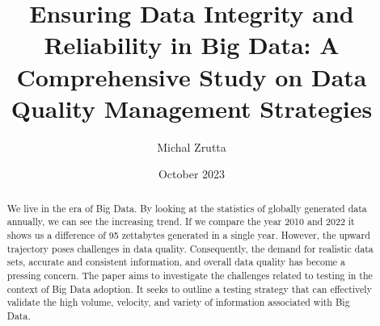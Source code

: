 \documentclass[12pt, letterpaper]{article}
\title{Ensuring Data Integrity and Reliability in Big Data: A Comprehensive Study on Data Quality Management Strategies}
\author{Michal Zrutta}
\date{October 2023}
\begin{document}
\maketitle

\begin{abstract}
We live in the era of Big Data. By looking at the statistics of globally generated data annually, we can 
see the increasing trend. If we compare the year 2010 and 2022 it shows us a difference of 95
zettabytes generated in a single year. However, the upward trajectory poses challenges in data 
quality. Consequently, the demand for realistic data sets, accurate and consistent information, and 
overall data quality has become a pressing concern. The paper aims to investigate the challenges 
related to testing in the context of Big Data adoption. It seeks to outline a testing strategy that can 
effectively validate the high volume, velocity, and variety of information associated with Big Data.\cite{gudivada2015big}\cite{mittal2013trustworthiness}
\end{abstract} 


\end{document}
